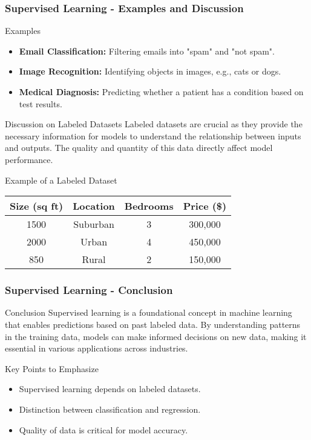 \documentclass[aspectratio=169]{beamer}
\begin{document}
\begin{frame}[fragile]
    \frametitle{Supervised Learning - Examples and Discussion}
    \begin{block}{Examples}
        \begin{itemize}
            \item \textbf{Email Classification:} Filtering emails into "spam" and "not spam".
            \item \textbf{Image Recognition:} Identifying objects in images, e.g., cats or dogs.
            \item \textbf{Medical Diagnosis:} Predicting whether a patient has a condition based on test results.
        \end{itemize}
    \end{block}
    
    \begin{block}{Discussion on Labeled Datasets}
        Labeled datasets are crucial as they provide the necessary information for models to understand the relationship between inputs and outputs. The quality and quantity of this data directly affect model performance.
    \end{block}

    \begin{block}{Example of a Labeled Dataset}
    \begin{tabular}{|c|c|c|c|}
        \hline
        Size (sq ft) & Location   & Bedrooms & Price (\$) \\
        \hline
        1500          & Suburban   & 3        & 300,000   \\
        2000          & Urban      & 4        & 450,000   \\
        850           & Rural      & 2        & 150,000   \\
        \hline
    \end{tabular}
    \end{block}
\end{frame}

\begin{frame}[fragile]
    \frametitle{Supervised Learning - Conclusion}
    \begin{block}{Conclusion}
        Supervised learning is a foundational concept in machine learning that enables predictions based on past labeled data. By understanding patterns in the training data, models can make informed decisions on new data, making it essential in various applications across industries.
    \end{block}
    
    \begin{block}{Key Points to Emphasize}
        \begin{itemize}
            \item Supervised learning depends on labeled datasets.
            \item Distinction between classification and regression.
            \item Quality of data is critical for model accuracy.
        \end{itemize}
    \end{block}
\end{frame}
\end{document}
